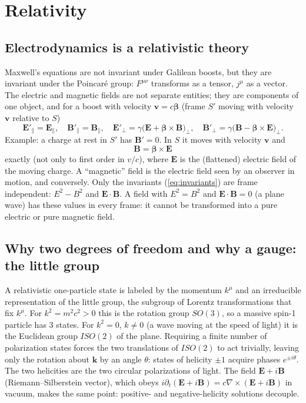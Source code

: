 \documentclass[11pt,a4paper]{book}
\begin{document}
\section{Relativity}
\label{sec:relativity}

\subsection{Electrodynamics is a relativistic theory}

Maxwell's equations are not invariant under Galilean boosts, but they are invariant under the
Poincar\'e group: $F^{\mu\nu}$ transforms as a tensor, $j^\mu$ as a vector. The electric and magnetic
fields are not separate entities; they are components of one object, and for a boost with velocity
$\mathbf v=c\boldsymbol\beta$ (frame $S'$ moving with velocity $\mathbf v$ relative to $S$)
\begin{equation}
\mathbf E'_\parallel=\mathbf E_\parallel,\quad
\mathbf B'_\parallel=\mathbf B_\parallel,\quad
\mathbf E'_\perp=\gamma\bigl(\mathbf E+\boldsymbol\beta\times\mathbf B\bigr)_\perp,\quad
\mathbf B'_\perp=\gamma\bigl(\mathbf B-\boldsymbol\beta\times\mathbf E\bigr)_\perp .
\end{equation}
Example: a charge at rest in $S'$ has $\mathbf B'=0$. In $S$ it moves with velocity $\mathbf v$ and
\begin{equation}
\mathbf B=\boldsymbol\beta\times\mathbf E
\end{equation}
exactly (not only to first order in $v/c$), where $\mathbf E$ is the (flattened) electric
field of the moving charge. A ``magnetic'' field is the electric field seen by an observer in motion,
and conversely. Only the invariants (\ref{eq:invariants}) are frame independent: $E^2-B^2$ and
$\mathbf E\cdot\mathbf B$. A field with $E^2=B^2$ and $\mathbf E\cdot\mathbf B=0$ (a plane wave)
has these values in every frame: it cannot be transformed into a pure electric or pure magnetic
field.

\subsection{Why two degrees of freedom and why a gauge: the little group}

A relativistic one-particle state is labeled by the momentum $k^\mu$ and an irreducible representation of
the little group, the subgroup of Lorentz transformations that fix $k^\mu$. For $k^2=m^2c^2>0$ this is the
rotation group $SO(3)$, so a massive spin-1 particle has $3$ states. For $k^2=0$, $k\ne0$ (a wave moving
at the speed of light) it is the Euclidean group $ISO(2)$ of the plane. Requiring a finite number of
polarization states forces the two translations of $ISO(2)$ to act trivially, leaving only the
rotation about $\mathbf k$ by an angle $\theta$: states of helicity $\pm1$ acquire phases
$e^{\pm i\theta}$. The two helicities are the two circular polarizations of light. The field $\mathbf E+i\mathbf B$
(Riemann--Silberstein vector), which obeys $i\partial_t(\mathbf E+i\mathbf B)=c\nabla\times(\mathbf E+i\mathbf B)$
in vacuum, makes the same point: positive- and negative-helicity solutions decouple.
\end{document}
